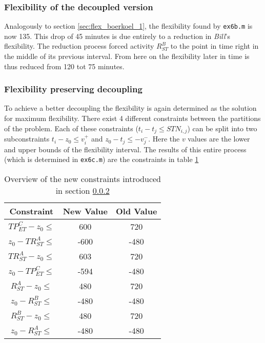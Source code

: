\documentclass[10pt,a4paper]{article}
\begin{document}
\subsubsection{Flexibility of the decoupled version}
Analogously to section \ref{sec:flex_boerkoel_1}, the flexibility found by \texttt{ex6b.m} is now 135. This drop of 45 minutes is due entirely to a reduction in \emph{Bill}'s flexibility. The reduction process forced activity $R^{B}_{ST}$ to the point in time right in the middle of its previous interval. From here on the flexibility later in time is thus reduced from 120 tot 75 minutes.

\subsubsection{Flexibility preserving decoupling}
\label{sec:preserving_decoupling}
To achieve a better decoupling the flexibility is again determined as the solution for maximum flexibility. There exist 4 different constraints between the partitions of the problem. Each of these constraints ($t_i - t_j \leq STN_{i,j}$) can be split into two subconstraints $t_i - z_0 \leq v_i^+$ and $z_0 - t_j \leq -v_j^-$. Here the $v$ values are the lower and upper bounds of the flexibility interval. The results of this entire process (which is determined in \texttt{ex6c.m}) are the constraints in table \ref{table:constraints}

\begin{table}
\centering
\begin{tabular}{ c | c | c }
Constraint & New Value & Old Value \\ \hline
$TP^C_{ET} - z_0 \leq $ & 600 & 720 \\
$z_0 - TR^A_{ST}\leq $ & -600 & -480 \\
$TR^A_{ST} - z_0\leq $ & 603 & 720 \\
$z_0 - TP^C_{ET}\leq $ & -594 & -480 \\
$R^A_{ST} - z_0 \leq $ & 480 & 720 \\
$z_0 - R^B_{ST} \leq $ & -480 & -480 \\
$R^B_{ST} - z_0\leq $ & 480 & 720 \\
$z_0 - R^A_{ST} \leq $ & -480 & -480
\end{tabular}
\caption{Overview of the new constraints introduced in section \ref{sec:preserving_decoupling}}
\label{table:constraints}
\end{table}
\end{document}
